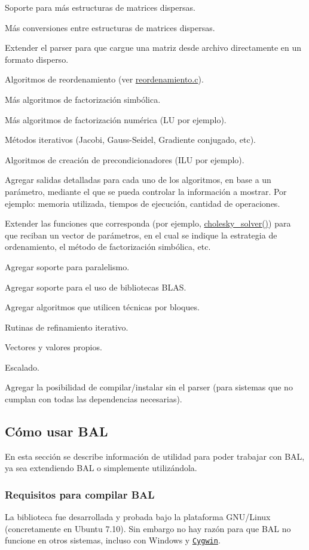 Soporte para más estructuras de matrices dispersas.\par
 Más conversiones entre estructuras de matrices dispersas.\par
 Extender el parser para que cargue una matriz desde archivo directamente en un formato disperso.\par
 Algoritmos de reordenamiento (ver \hyperlink{reordenamiento_8c}{reordenamiento.c}).\par
 Más algoritmos de factorización simbólica.\par
 Más algoritmos de factorización numérica (LU por ejemplo).\par
 Métodos iterativos (Jacobi, Gauss-Seidel, Gradiente conjugado, etc).\par
 Algoritmos de creación de precondicionadores (ILU por ejemplo).\par
 Agregar salidas detalladas para cada uno de los algoritmos, en base a un parámetro, mediante el que se pueda controlar la información a mostrar. Por ejemplo: memoria utilizada, tiempos de ejecución, cantidad de operaciones.\par
 Extender las funciones que corresponda (por ejemplo, \hyperlink{cholesky_8c_b61e2da86cddb63b2ef5d38b46a1d4ea}{cholesky\_\-solver()}) para que reciban un vector de parámetros, en el cual se indique la estrategia de ordenamiento, el método de factorización simbólica, etc.\par
 Agregar soporte para paralelismo.\par
 Agregar soporte para el uso de bibliotecas BLAS.\par
 Agregar algoritmos que utilicen técnicas por bloques.\par
 Rutinas de refinamiento iterativo.\par
 Vectores y valores propios.\par
 Escalado.\par
 Agregar la posibilidad de compilar/instalar sin el parser (para sistemas que no cumplan con todas las dependencias necesarias).\par
\hypertarget{index_howtosec}{}\subsection{Cómo usar BAL}\label{index_howtosec}
En esta sección se describe información de utilidad para poder trabajar con BAL, ya sea extendiendo BAL o simplemente utilizándola.\hypertarget{index_reqsec}{}\subsubsection{Requisitos para compilar BAL}\label{index_reqsec}
La biblioteca fue desarrollada y probada bajo la plataforma GNU/Linux (concretamente en Ubuntu 7.10). Sin embargo no hay razón para que BAL no funcione en otros sistemas, incluso con Windows y \href{http://es.wikipedia.org/wiki/Cygwin}{\tt Cygwin}.

